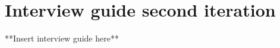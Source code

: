 \documentclass[../Main/thesis.tex]{subfiles}
\begin{document}
\chapter{Interview guide second iteration}
\label{app:interview-guide-second}
**Insert interview guide here**
\end{document}
